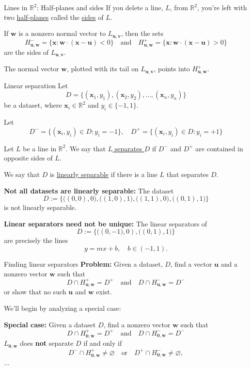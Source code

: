 \documentclass{beamer}
\newcommand{\vu}{\boldsymbol{u}}
\newcommand{\vv}{\boldsymbol{v}}
\newcommand{\vw}{\boldsymbol{w}}
\newcommand{\vx}{\boldsymbol{x}}
\newcommand{\vzero}{\boldsymbol{0}}
\newcommand{\RR}{\mathbb{R}}
\begin{document}
\begin{frame}{Lines in $\RR^2$: Half-planes and sides}
    If you delete a line, $L$, from $\RR^2$, you're left with two \underline{half-planes} called the \underline{sides} of $L$.

    If $\vw$ is a nonzero normal vector to $L_{\vu, \vv}$, then the sets
    \[
        H_{\vu, \vw}^- =
        \{\vx : \vw\cdot(\vx - \vu) < 0\}
        \quad\text{and}\quad
        H_{\vu, \vw}^+ = \{\vx : \vw\cdot(\vx - \vu) > 0\}
    \]
    are the sides of $L_{\vu, \vv}$.

    The normal vector $\vw$, plotted with its tail on $L_{\vu, \vv}$, points into $H_{\vu, \vw}^+$.
\end{frame}

\begin{frame}{Linear separation}
    Let
    \[
        D=\big\{(\vx_1, y_1), (\vx_2, y_2),\ldots, (\vx_n, y_n)\big\}
    \]
    be a dataset, where $\vx_i\in \RR^2$ and $y_i\in \{-1, 1\}$.

    Let
    \[
        D^-=\big\{(\vx_i, y_i)\in D : y_i=-1\big\},
        \quad
        D^+=\big\{(\vx_i, y_i)\in D : y_i=+1\big\}
    \]

    Let $L$ be a line in $\RR^2$. We say that \underline{$L$ separates $D$} if $D^-$ and $D^+$
    are contained in opposite sides of $L$.

    We say that $D$ is \underline{linearly separable} if there is a line $L$ that separates $D$.
\end{frame}

\begin{frame}{}

    \textbf{Not all datasets are linearly separable:} The dataset
    \[
        D := \Big\{\big((0, 0), 0\big), \big((1, 0), 1\big),
        \big((1, 1), 0\big), \big((0, 1), 1\big) \Big\}
    \]
    is not linearly separable.

    \textbf{Linear separators need not be unique:} The linear separators of
    \[
        D := \Big\{\big((0, -1\big), 0), \big((0, 1), 1\big) \Big\}
    \]
    are precisely the lines
    \[
        y=mx+b,\quad b\in (-1, 1).
    \]



\end{frame}

\begin{frame}{Finding linear separators}
    \textbf{Problem:}
    Given a dataset, $D$, find a vector $\vu$ and a nonzero vector $\vw$
    such that
    \[
        D\cap H_{\vu, \vw}^+ = D^+
        \quad\text{and}\quad
        D\cap H_{\vu, \vw}^- = D^-
    \]
    or show that no such $\vu$ and $\vw$ exist.

    We'll begin by analyzing a special case:

    \textbf{Special case:} Given a dataset $D$, find a nonzero vector $\vw$
    such that
    \[
        D\cap H_{\vzero, \vw}^+ = D^+
        \quad\text{and}\quad
        D\cap H_{\vzero, \vw}^- = D^-
    \]
    $L_{\vzero, \vw}$ does \textbf{not} separate $D$ if and only if
    \[
        D^-\cap H_{\vzero, \vw}^+\neq\varnothing
        \quad\text{or}\quad
        D^+\cap H_{\vzero, \vw}^-\neq\varnothing,
    \]
    ...
\end{frame}
\end{document}
